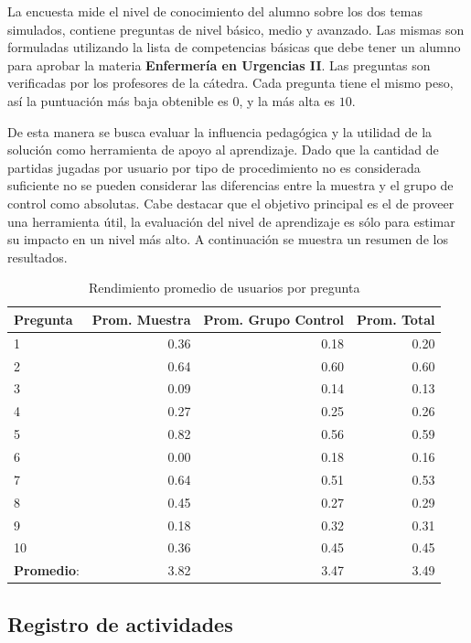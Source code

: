 La encuesta mide el nivel de conocimiento del alumno sobre los dos temas 
simulados, contiene preguntas de nivel básico, medio y avanzado. Las mismas 
son formuladas utilizando la lista de competencias básicas que debe tener un 
alumno para aprobar la materia \textbf{Enfermería en Urgencias II}. Las 
preguntas son verificadas  por los profesores de la cátedra. Cada pregunta 
tiene el mismo peso, así la puntuación más baja obtenible es $0$, y la más 
alta es $10$.

De esta manera se busca evaluar la influencia pedagógica y la utilidad de la 
solución como herramienta de apoyo al aprendizaje. Dado que la cantidad de 
partidas jugadas por usuario por tipo de procedimiento no es considerada 
suficiente no se pueden considerar las diferencias entre la muestra y el 
grupo de control como absolutas. Cabe destacar que el objetivo principal es 
el de proveer una herramienta útil, la evaluación del nivel de aprendizaje 
es sólo para estimar su impacto en un nivel más alto. A continuación se 
muestra un resumen de los resultados.

\begin{table}[!hbt]
\centering
\caption{Rendimiento promedio de usuarios por pregunta}
\begin{tabular}{lrrr}
\toprule
\textbf{Pregunta} & 
\textbf{Prom. Muestra} & 
\textbf{Prom. Grupo Control} & 
\textbf{Prom. Total} \\ 
\midrule
1         & 0.36 & 0.18 & 0.20 \\
2         & 0.64 & 0.60 & 0.60 \\
3         & 0.09 & 0.14 & 0.13 \\
4         & 0.27 & 0.25 & 0.26 \\
5         & 0.82 & 0.56 & 0.59 \\
6         & 0.00 & 0.18 & 0.16 \\
7         & 0.64 & 0.51 & 0.53 \\
8         & 0.45 & 0.27 & 0.29 \\
9         & 0.18 & 0.32 & 0.31 \\
10        & 0.36 & 0.45 & 0.45 \\
\midrule
\textbf{Promedio}: & 3.82 & 3.47 & 3.49  \\
\bottomrule
\end{tabular}

\label{tab:objetiva_rendimiento_por_pregunta}
\end{table}

\subsection{Registro de actividades}

